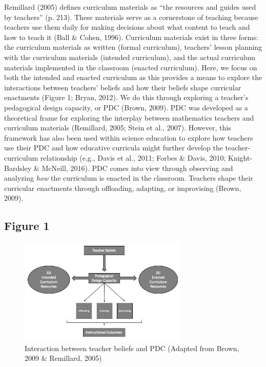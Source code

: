 \documentclass[11.5pt]{sig-alternate}
\begin{document}
\begin{large}
Remillard (2005) defines curriculum materials as “the resources and guides used by teachers” (p. 213). These materials serve as a cornerstone of teaching because teachers use them daily for making decisions about what content to teach and how to teach it (Ball \& Cohen, 1996). Curriculum materials exist in three forms: the curriculum materials as written (formal curriculum), teachers’ lesson planning with the curriculum materials (intended curriculum), and the actual curriculum materials implemented in the classroom (enacted curriculum). Here, we focus on both the intended and enacted curriculum as this provides a means to explore the interactions between teachers’ beliefs and how their beliefs shape curricular enactments (Figure 1; Bryan, 2012). We do this through exploring a teacher’s pedagogical design capacity, or PDC (Brown, 2009). PDC was developed as a theoretical frame for exploring the interplay between mathematics teachers and curriculum materials (Remillard, 2005; Stein et al., 2007). However, this framework has also been used within science education to explore how teachers use their PDC and how educative curricula might further develop the teacher-curriculum relationship (e.g., Davis et al., 2011; Forbes \& Davis, 2010; Knight-Bardsley \& McNeill, 2016). PDC comes into view through observing and analyzing \textit{how} the curriculum is enacted in the classroom. Teachers shape their curricular enactments through offloading, adapting, or improvising (Brown, 2009).

\subsection*{Figure 1}

\begin{figure}[htp]
    \centering
    \includegraphics[width=8cm]{figure1.jpg}
 \caption*{Interaction between teacher beliefs and PDC (Adapted from Brown, 2009 \& Remillard, 2005)}
    \label{Interaction between teacher beliefs and PDC (Adapted from Brown, 2009 & Remillard, 2005)}
\end{figure}


\end{large}
\end{document}
